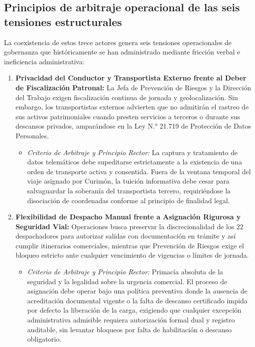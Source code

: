 \subsection{Principios de arbitraje operacional de las seis tensiones estructurales}\label{sec:2-arbitraje}

La coexistencia de estos trece actores genera seis tensiones operacionales de gobernanza que históricamente se han administrado mediante fricción verbal e ineficiencia administrativa:

\begin{enumerate}
  \item \textbf{Privacidad del Conductor y Transportista Externo frente al Deber de Fiscalización Patronal:} La Jefa de Prevención de Riesgos y la Dirección del Trabajo exigen fiscalización continua de jornada y geolocalización. Sin embargo, los transportistas externos advierten que no admitirán el rastreo de sus activos patrimoniales cuando presten servicios a terceros o durante sus descansos privados, amparándose en la Ley N.° 21.719 de Protección de Datos Personales.
  \begin{itemize}
    \item \textit{Criterio de Arbitraje y Principio Rector:} La captura y tratamiento de datos telemáticos debe supeditarse estrictamente a la existencia de una orden de transporte activa y consentida. Fuera de la ventana temporal del viaje asignado por Curimón, la tuición informativa debe cesar para salvaguardar la soberanía del transportista tercero, requiriéndose la disociación de coordenadas conforme al principio de finalidad legal.
  \end{itemize}
  \item \textbf{Flexibilidad de Despacho Manual frente a Asignación Rigurosa y Seguridad Vial:} Operaciones busca preservar la discrecionalidad de los 22 despachadores para autorizar salidas con documentación en trámite y así cumplir itinerarios comerciales, mientras que Prevención de Riesgos exige el bloqueo estricto ante cualquier vencimiento de vigencias o límites de jornada.
  \begin{itemize}
    \item \textit{Criterio de Arbitraje y Principio Rector:} Primacía absoluta de la seguridad y la legalidad sobre la urgencia comercial. El proceso de asignación debe operar bajo una política preventiva donde la ausencia de acreditación documental vigente o la falta de descanso certificado impida por defecto la liberación de la carga, exigiendo que cualquier excepción administrativa admisible requiera autorización formal dual y registro auditable, sin levantar bloqueos por falta de habilitación o descanso obligatorio.

\end{itemize}
\end{enumerate}
